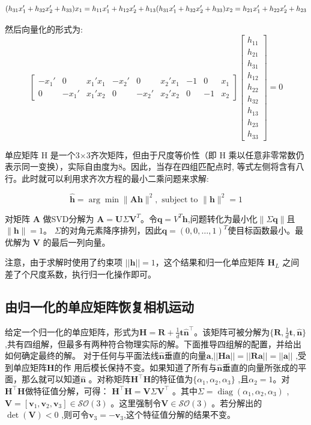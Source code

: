 \documentclass{article}
\begin{document}
$$(h_{31}x_1'+h_{32}x_2'+h_{33})x_1=h_{11}x_1'+h_{12}x_2'+h_{13}\\(h_{31}x_1'+h_{32}x_2'+h_{33})x_2=h_{21}x_1'+h_{22}x_2'+h_{23}$$

然后向量化的形式为:
$$\begin{bmatrix}
-x_1' & 0 & x_1'x_1 & -x_2' & 0 & x_2'x_1 & -1 & 0 & x_1 \\
0 & -x_1' & x_1'x_2 & 0 & -x_2' & x_2'x_2 & 0 & -1 & x_2
\end{bmatrix}
\begin{bmatrix}
h_{11} \\
h_{21} \\
h_{31} \\
h_{12} \\
h_{22} \\
h_{32} \\
h_{13} \\
h_{23} \\
h_{33}
\end{bmatrix}
= 0$$

单应矩阵 H 是一个3×3齐次矩阵，但由于尺度等价性（即 H 乘以任意非零常数仍表示同一变换），实际自由度为8。因此，当存在四组匹配点时, 等式左侧将含有八行。此时就可以利用求齐次方程的最小二乘问题来求解:

$$\hat{\mathbf{h}}=\arg\min\|\mathbf{A}\mathbf{h}\|^2,\text{ subject to }\|\mathbf{h}\|^2=1$$

对矩阵 $\mathbf{A}$ 做SVD分解为 $\mathbf{A} = \mathbf{U}\Sigma\mathbf{V}^T$。令$\mathbf{q}=V^T\mathbf{h}$,问题转化为最小化$\|\Sigma\mathbf{q}\|$且$\|\mathbf{h}\|=1$。
$\Sigma$的对角元素降序排列，因此$\mathbf{q}=(0,0,\ldots,1)^T$使目标函数最小。最优解为 $\mathbf{V}$ 的最后一列向量。

注意，由于求解时使用了约束项 $||\mathbf{h}|| = 1$，这个结果和归一化单应矩阵 $\mathbf{H}_L$ 之间差了个尺度系数，执行归一化操作即可。

\subsection{由归一化的单应矩阵恢复相机运动}

给定一个归一化的单应矩阵，形式为$\mathbf{H}=\mathbf{R}+\frac1d\mathbf{t}\hat{\mathbf{n}}^\top$。该矩阵可被分解为$\{\mathbf{R},\frac1d\mathbf{t},\hat{\mathbf{n}}\}$ ,共有四组解，但最多有两种符合物理实际的解\cite{ma2004invitation}。下面推导四组解的配置，并给出如何确定最终的解。
对于任何与平面法线$\hat{\mathbf{n}}$垂直的向量$\mathbf{a}$,$||\mathbf{Ha}||=||\mathbf{Ra}||=||\mathbf{a}||$ ,受到单应矩阵$\mathbf{H}$的作
用后模长保持不变。如果知道了所有与$\hat{\mathbf{n}}$垂直的向量所张成的平面，那么就可以知道$\hat{\mathbf{n}}$ 。对称矩阵$\mathbf{H}^\top\mathbf{H}$的特征值为$\{\alpha_1,\alpha_2,\alpha_3\}$ ,且$\alpha_{2}=1$。对$\mathbf{H}^\top\mathbf{H}$做特征值分解，可得：
$\mathbf{H}^\top\mathbf{H}=\mathbf{V}\Sigma\mathbf{V}^\top$
。其中$\Sigma=\operatorname{diag}(\alpha_1,\alpha_2,\alpha_3)$ , $\mathbf{V}=[\mathbf{v}_1,\mathbf{v}_2,\mathbf{v}_3]\in\mathcal{SO}(3)$ 。这里强制令$\mathbf{V}\in\mathcal{SO}(3)$
。若分解出的$\det(\mathbf{V})<0$ ,则可令$\mathbf{v}_3=-\mathbf{v}_3$,这个特征值分解的结果不变。
\end{document}
